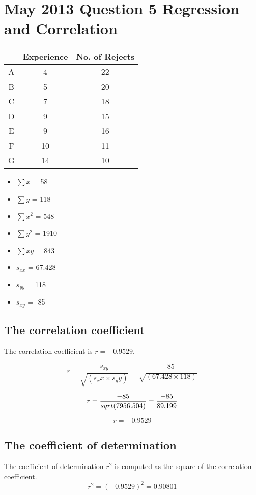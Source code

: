 \documentclass[12pts]{article}
\begin{document}
\section*{May 2013 Question 5 Regression and Correlation}
\begin{center}
\begin{tabular}{|c|c|c|}
\hline  & Experience & No. of Rejects \\ 
\hline A & 4 & 22 \\ 
\hline B & 5 & 20 \\ 
\hline C & 7 & 18 \\ 
\hline D & 9 & 15 \\ 
\hline E & 9 & 16 \\ 
\hline F & 10 & 11 \\ 
\hline G & 14 & 10 \\ 
\hline 
\end{tabular} 
\end{center}

\begin{itemize}
\item $\sum x$ = 58
\item $\sum y$ = 118
\item $\sum x^2$ = 548
\item $\sum y^2$ = 1910
\item $\sum xy$ = 843
\end{itemize}

\begin{itemize}
\item $s_{xx}$ = 67.428
\item $s_{yy}$ = 118
\item $s_{xy}$ = -85
\end{itemize}
\subsection*{The correlation coefficient}
The correlation coefficient is $r = -0.9529$.

\[ r = \frac{s_{xy}}{\sqrt{(s_xx \times s_yy)}}= \frac{-85}{\sqrt{(67.428 \times 118)}}\]

\[r= \frac{-85}{sqrt{(7956.504)}} =  {-85 \over 89.199}  \]

\[r = -0.9529\]

\subsection*{The coefficient of determination}
The coefficient of determination $r^2$ is computed as the square of the correlation coefficient.
\[r^2 = (-0.9529)^2 = 0.90801\]
\end{document}
